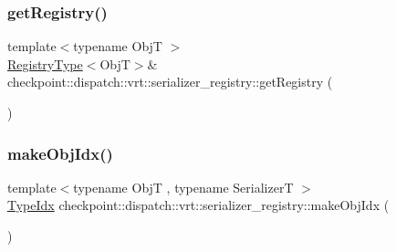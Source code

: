 \subsubsection{\texorpdfstring{get\+Registry()}{getRegistry()}}
{\footnotesize\ttfamily template$<$typename ObjT $>$ \\
\hyperlink{namespacecheckpoint_1_1dispatch_1_1vrt_1_1serializer__registry_a93af9f3c271f2e1356cdaf8944831cc3}{Registry\+Type}$<$ObjT$>$\& checkpoint\+::dispatch\+::vrt\+::serializer\+\_\+registry\+::get\+Registry (\begin{DoxyParamCaption}{ }\end{DoxyParamCaption})\hspace{0.3cm}{\ttfamily [inline]}}

\mbox{\label{namespacecheckpoint_1_1dispatch_1_1vrt_1_1serializer__registry_ab059eccb4c15860ca2cc1e07aef2a8cc}} 
\subsubsection{\texorpdfstring{make\+Obj\+Idx()}{makeObjIdx()}}
{\footnotesize\ttfamily template$<$typename ObjT , typename SerializerT $>$ \\
\hyperlink{namespacecheckpoint_1_1dispatch_1_1vrt_acd3f9e6b091bcfbc23dc35ea8ef45d3b}{Type\+Idx} checkpoint\+::dispatch\+::vrt\+::serializer\+\_\+registry\+::make\+Obj\+Idx (\begin{DoxyParamCaption}{ }\end{DoxyParamCaption})\hspace{0.3cm}{\ttfamily [inline]}}

